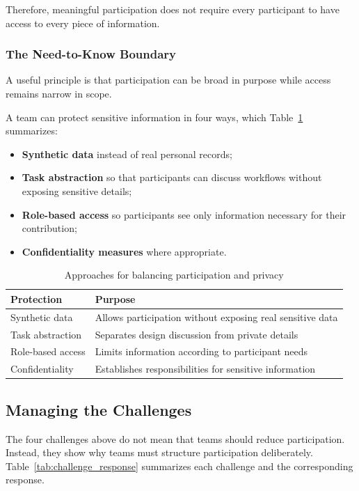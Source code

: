 \documentclass[a4paper,12pt]{article}
\begin{document}
Therefore, meaningful participation does not require every participant to
have access to every piece of information.


\subsubsection{The Need-to-Know Boundary}

A useful principle is that participation can be broad in purpose while access
remains narrow in scope.

A team can protect sensitive information in four ways, which
Table~\ref{tab:privacy} summarizes:

\begin{itemize}
    \item \textbf{Synthetic data} instead of real personal records;
    \item \textbf{Task abstraction} so that participants can discuss workflows
    without exposing sensitive details;
    \item \textbf{Role-based access} so participants see only information
    necessary for their contribution;
    \item \textbf{Confidentiality measures} where appropriate.
\end{itemize}

\begin{table}[H]
\centering
\begin{tabularx}{\textwidth}{@{}l X@{}}
\toprule
\rowcolor{myblue!20}
\textbf{Protection} & \textbf{Purpose} \\
\midrule
Synthetic data & Allows participation without exposing real sensitive data \\
Task abstraction & Separates design discussion from private details \\
Role-based access & Limits information according to participant needs \\
Confidentiality & Establishes responsibilities for sensitive information \\
\bottomrule
\end{tabularx}
\caption{Approaches for balancing participation and privacy}
\label{tab:privacy}
\end{table}


\subsection{Managing the Challenges}

The four challenges above do not mean that teams should reduce participation.
Instead, they show why teams must structure participation deliberately.
Table~\ref{tab:challenge_response} summarizes each challenge and the
corresponding response.
\end{document}
